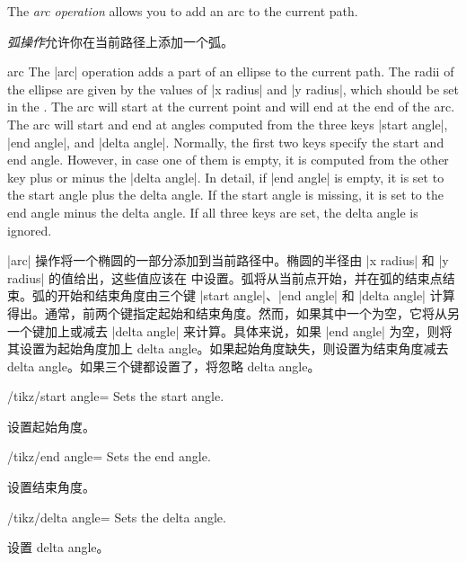 The \emph{arc operation} allows you to add an arc to the current path.

\emph{弧操作}允许你在当前路径上添加一个弧。

%
\begin{pathoperation}{arc}{}
    The |arc| operation adds a part of an ellipse to the current path. The
    radii of the ellipse are given by the values of |x radius| and |y radius|,
    which should be set in the . The arc will start at   the
    current point and will end at the end of the arc. The arc  will start and
    end at angles computed from the three keys |start angle|, |end angle|, and
    |delta angle|. Normally, the first two keys specify the start and end
    angle. However, in case one of them is empty, it is computed from the other
    key plus or minus the |delta angle|. In detail, if |end angle| is empty, it
    is set to the start angle plus the delta angle. If the start angle is
    missing, it is set to the end angle minus the delta angle. If all three
    keys are set, the delta angle is ignored.

    |arc| 操作将一个椭圆的一部分添加到当前路径中。椭圆的半径由 |x radius| 和 |y radius| 的值给出，这些值应该在  中设置。弧将从当前点开始，并在弧的结束点结束。弧的开始和结束角度由三个键 |start angle|、|end angle| 和 |delta angle| 计算得出。通常，前两个键指定起始和结束角度。然而，如果其中一个为空，它将从另一个键加上或减去 |delta angle| 来计算。具体来说，如果 |end angle| 为空，则将其设置为起始角度加上 delta angle。如果起始角度缺失，则设置为结束角度减去 delta angle。如果三个键都设置了，将忽略 delta angle。

    \begin{key}{/tikz/start angle=}
        Sets the start angle.

        设置起始角度。

    \end{key}
    \begin{key}{/tikz/end angle=}
        Sets the end angle.

        设置结束角度。

    \end{key}
    \begin{key}{/tikz/delta angle=}
        Sets the delta angle.

        设置 delta angle。

    \end{key}

\begin{codeexample}[]
\end{codeexample}


\end{pathoperation}

